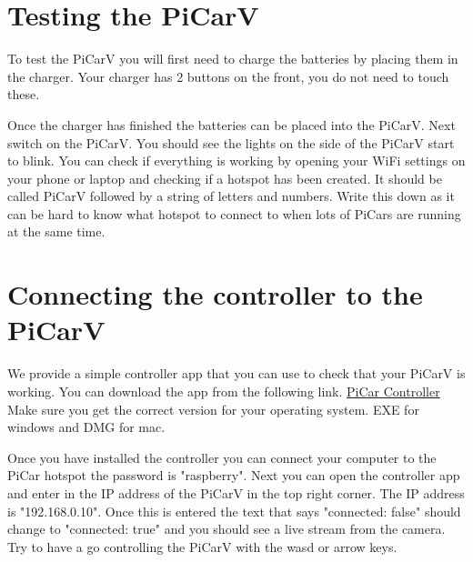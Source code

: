 \documentclass[11pt]{report}
\begin{document}

\section{Testing the PiCarV}
To test the PiCarV you will first need to charge the batteries by placing them in the charger. Your charger has 2 buttons on the front, you do not need to touch these.


Once the charger has finished the batteries can be placed into the PiCarV. Next switch on the PiCarV. You should see the lights on the side of the PiCarV start to blink. You can check if everything is working by opening your WiFi settings on your phone or laptop and checking if a hotspot has been created. It should be called PiCarV followed by a string of letters and numbers. Write this down as it can be hard to know what hotspot to connect to when lots of PiCars are running at the same time.

\section{Connecting the controller to the PiCarV}
We provide a simple controller app that you can use to check that your PiCarV is working. You can download the app from the following link. 
\href{https://github.com/PiCarV/Controller/releases}{PiCar Controller} Make sure you get the correct version for your operating system. EXE for windows and DMG for mac.


Once you have installed the controller you can connect your computer to the PiCar hotspot the password is "raspberry". Next you can open the controller app and enter in the IP address of the PiCarV in the top right corner. The IP address is "192.168.0.10". Once this is entered the text that says "connected: false" should change to "connected: true" and you should see a live stream from the camera. Try to have a go controlling the PiCarV with the wasd or arrow keys. 
\end{document}
